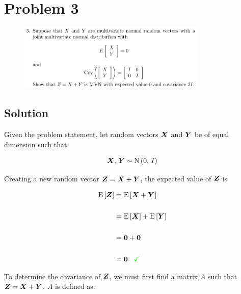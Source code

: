 
\begingroup
\allowdisplaybreaks

\newpage
\section*{Problem 3}

\begin{figure}[h]
	\centering
	\includegraphics[width=0.8\textwidth]{./images/prob3_statement.png}
\end{figure}

\subsection*{Solution}

Given the problem statement, let random vectors $\boldsymbol{X}$ and $\boldsymbol{Y}$ be of equal dimension such that

\begin{align*}
	\boldsymbol{X},\,\boldsymbol{Y} \sim \textrm{N}\left(0,\,I\right)
\end{align*}

Creating a new random vector $\boldsymbol{Z} = \boldsymbol{X} + \boldsymbol{Y}$, the expected value of $\boldsymbol{Z}$ is

\begin{align*}
	\textrm{E}\left[\boldsymbol{Z}\right] &= \textrm{E}\left[\boldsymbol{X} + \boldsymbol{Y}\right] \\
	\\
	&= \textrm{E}\left[\boldsymbol{X}\right] + \textrm{E}\left[\boldsymbol{Y}\right] \\
	\\
	&= \boldsymbol{0} + \boldsymbol{0} \\
	\\
	&= \boldsymbol{0} \,\,\,\,\, \textcolor{green}{\checkmark}
\end{align*}

To determine the covariance of $\boldsymbol{Z}$, we must first find a matrix $A$ such that $\boldsymbol{Z} = \boldsymbol{X} + \boldsymbol{Y}$. $A$ is defined as:

